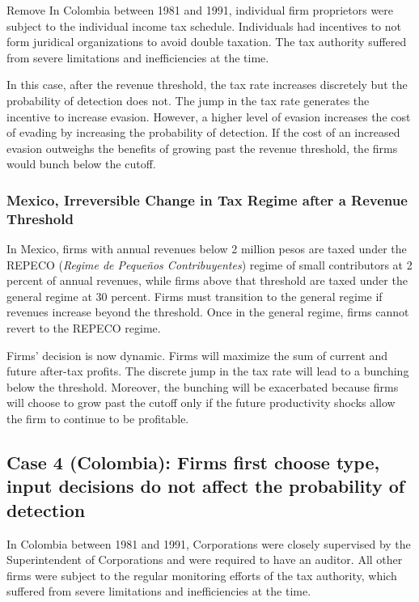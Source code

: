 \documentclass[
  12pt]{article}
\theoremstyle{definition}
\theoremstyle{remark}
\begin{document}
\begin{anfxnote}{Remove}
In Colombia between 1981 and 1991, individual firm proprietors were
subject to the individual income tax schedule. Individuals had
incentives to not form juridical organizations to avoid double taxation.
The tax authority suffered from severe limitations and inefficiencies at
the time.

In this case, after the revenue threshold, the tax rate increases
discretely but the probability of detection does not. The jump in the
tax rate generates the incentive to increase evasion. However, a higher
level of evasion increases the cost of evading by increasing the
probability of detection. If the cost of an increased evasion outweighs
the benefits of growing past the revenue threshold, the firms would
bunch below the cutoff.

\subsubsection{Mexico, Irreversible Change in Tax Regime after a Revenue
Threshold}\label{mexico-irreversible-change-in-tax-regime-after-a-revenue-threshold}

In Mexico, firms with annual revenues below 2 million pesos are taxed
under the REPECO (\emph{Regime de Pequeños Contribuyentes}) regime of
small contributors at 2 percent of annual revenues, while firms above
that threshold are taxed under the general regime at 30 percent. Firms
must transition to the general regime if revenues increase beyond the
threshold. Once in the general regime, firms cannot revert to the REPECO
regime.

Firms' decision is now dynamic. Firms will maximize the sum of current
and future after-tax profits. The discrete jump in the tax rate will
lead to a bunching below the threshold. Moreover, the bunching will be
exacerbated because firms will choose to grow past the cutoff only if
the future productivity shocks allow the firm to continue to be
profitable.

\subsection{Case 4 (Colombia): Firms first choose type, input decisions
do not affect the probability of
detection}\label{case-4-colombia-firms-first-choose-type-input-decisions-do-not-affect-the-probability-of-detection}

In Colombia between 1981 and 1991, Corporations were closely supervised
by the Superintendent of Corporations and were required to have an
auditor. All other firms were subject to the regular monitoring efforts
of the tax authority, which suffered from severe limitations and
inefficiencies at the time.


\end{anfxnote}
\end{document}
